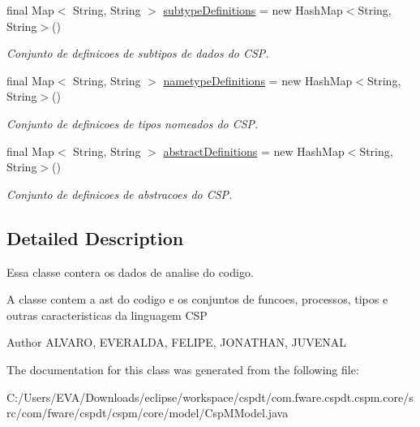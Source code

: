 \begin{DoxyCompactItemize}
final Map$<$ String, String $>$ \hyperlink{classcom_1_1fware_1_1cspdt_1_1cspm_1_1core_1_1model_1_1_csp_m_model_a635d031bc7fefc435cc03539814a1fd2}{subtype\+Definitions} = new Hash\+Map$<$String, String$>$()
\begin{DoxyCompactList}\small\item\em Conjunto de definicoes de subtipos de dados do C\+SP. \end{DoxyCompactList}\item 
\mbox{\label{classcom_1_1fware_1_1cspdt_1_1cspm_1_1core_1_1model_1_1_csp_m_model_a16e2992fb47391708e35f7f054563764}} 
final Map$<$ String, String $>$ \hyperlink{classcom_1_1fware_1_1cspdt_1_1cspm_1_1core_1_1model_1_1_csp_m_model_a16e2992fb47391708e35f7f054563764}{nametype\+Definitions} = new Hash\+Map$<$String, String$>$()
\begin{DoxyCompactList}\small\item\em Conjunto de definicoes de tipos nomeados do C\+SP. \end{DoxyCompactList}\item 
\mbox{\label{classcom_1_1fware_1_1cspdt_1_1cspm_1_1core_1_1model_1_1_csp_m_model_a846aaf42254ecf524887f5fcec29e2ac}} 
final Map$<$ String, String $>$ \hyperlink{classcom_1_1fware_1_1cspdt_1_1cspm_1_1core_1_1model_1_1_csp_m_model_a846aaf42254ecf524887f5fcec29e2ac}{abstract\+Definitions} = new Hash\+Map$<$String, String$>$()
\begin{DoxyCompactList}\small\item\em Conjunto de definicoes de abstracoes do C\+SP. \end{DoxyCompactList}\end{DoxyCompactItemize}


\subsection{Detailed Description}
Essa classe contera os dados de analise do codigo. 

A classe contem a ast do codigo e os conjuntos de funcoes, processos, tipos e outras caracteristicas da linguagem C\+SP

\begin{DoxyAuthor}{Author}
A\+L\+V\+A\+RO, E\+V\+E\+R\+A\+L\+DA, F\+E\+L\+I\+PE, J\+O\+N\+A\+T\+H\+AN, J\+U\+V\+E\+N\+AL 
\end{DoxyAuthor}


The documentation for this class was generated from the following file\+:\begin{DoxyCompactItemize}
\item 
C\+:/\+Users/\+E\+V\+A/\+Downloads/eclipse/workspace/cspdt/com.\+fware.\+cspdt.\+cspm.\+core/src/com/fware/cspdt/cspm/core/model/Csp\+M\+Model.\+java\end{DoxyCompactItemize}

